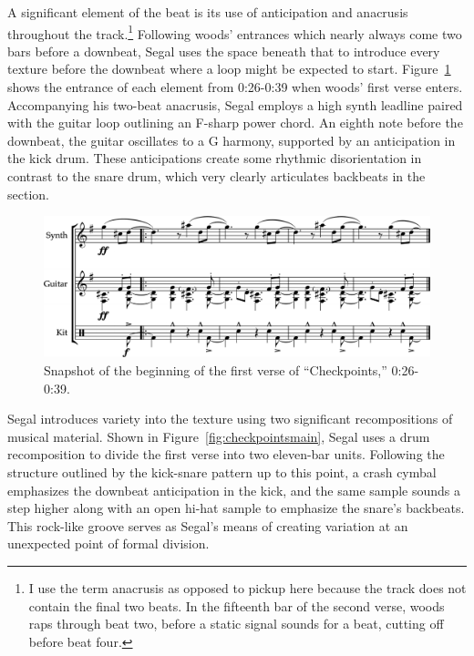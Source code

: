 A significant element of the beat is its use of anticipation and anacrusis throughout the 
track.\footnote{I use the term anacrusis as opposed to pickup here because the track does not contain
the final two beats. In the fifteenth bar of the second verse, woods raps through beat two, before 
a static signal sounds for a beat, cutting off before beat four.} Following woods' entrances which 
nearly always come two bars before a downbeat, Segal uses the space beneath that to introduce every 
texture before the downbeat where a loop might be expected to start. Figure~\ref{fig:checkpointsintro} 
shows the entrance of each element from 0:26-0:39 when woods' first verse enters. Accompanying his 
two-beat anacrusis, Segal employs a high synth leadline paired with the guitar loop outlining an F-sharp
power chord. An eighth note before the downbeat, the guitar oscillates to a G harmony, supported by an
anticipation in the kick drum. These anticipations create some rhythmic disorientation in contrast 
to the snare drum, which very clearly articulates backbeats in the section.

    \begin{figure}[ht]
        \centering
        \includegraphics[width=\textwidth]{images/figures/chp 02/026039checkpointsintro.pdf}
        \caption{Snapshot of the beginning of the first verse of ``Checkpoints,'' 0:26-0:39.}
        \label{fig:checkpointsintro}
    \end{figure}

Segal introduces variety into the texture using two significant recompositions of musical material. 
Shown in Figure~\ref{fig:checkpointsmain}, Segal uses a drum recomposition to divide the first verse 
into two eleven-bar units. Following the structure outlined by the kick-snare pattern up to this point,
a crash cymbal emphasizes the downbeat anticipation in the kick, and the same sample sounds a step 
higher along with an open hi-hat sample to emphasize the snare's backbeats. This rock-like groove 
serves as Segal's means of creating variation at an unexpected point of formal division.

